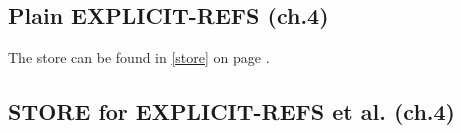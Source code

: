 \documentclass[../codeprint.tex]{subfiles}
\begin{document}
\subsection{Plain EXPLICIT-REFS (ch.4)}
\label{lang:EXPLICIT-REFS}
The store can be found in \autoref{store} on page \pageref{store}.



\subsection{STORE for EXPLICIT-REFS et al. (ch.4)}

\end{document}
